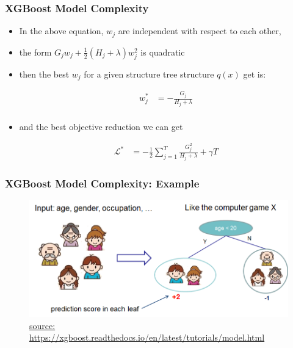 \documentclass[
  shownotes,
  xcolor={svgnames},
  hyperref={colorlinks,citecolor=DarkBlue,linkcolor=DarkRed,urlcolor=DarkBlue}
  , aspectratio=169]{beamer}
\begin{document}
\begin{frame}[fragile]
\frametitle{XGBoost Model Complexity}

\begin{itemize}
\item In the above equation, $w_j$ are independent with respect to each other, 
\item the form $G_jw_j+\frac{1}{2}(H_j+\lambda)w_j^2$  is quadratic 
\item then the best $w_j$ for a given structure tree structure $q(x)$ get is:


\begin{align}
w_j^\ast &= -\frac{G_j}{H_j+\lambda}\\
\end{align}


\item and the best objective reduction we can get

\begin{align}
\mathcal{L}^\ast &= -\frac{1}{2} \sum_{j=1}^T \frac{G_j^2}{H_j+\lambda} + \gamma T
\end{align}

\end{itemize}



 

\end{frame}
\begin{frame}[fragile]
\frametitle{XGBoost Model Complexity: Example}
  \begin{figure}[H] \centering
            \captionsetup{justification=centering}
              \includegraphics[scale=0.6]{figures/cart}
              \\
              \tiny
              \url{source: https://xgboost.readthedocs.io/en/latest/tutorials/model.html}
 \end{figure}

\end{frame}
\end{document}
